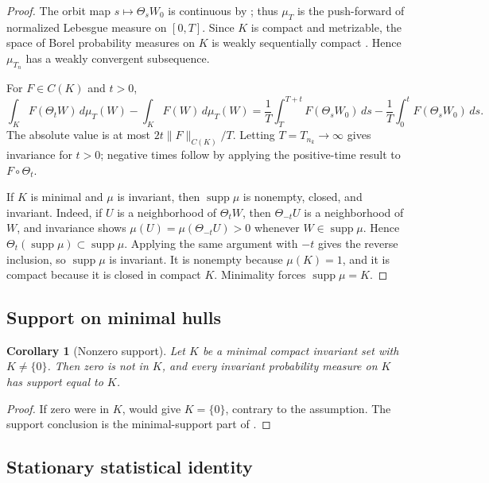 \documentclass[11pt]{amsart}
\theoremstyle{plain}
\newtheorem{corollary}[theorem]{Corollary}
\theoremstyle{definition}
\theoremstyle{remark}
\numberwithin{equation}{section}
\newcommand{\supp}{\operatorname{supp}}
\begin{document}
\begin{proof}
The orbit map \(s\mapsto\Theta_sW_0\) is continuous by
; thus \(\mu_T\) is the push-forward of normalized
Lebesgue measure on \([0,T]\).  Since \(K\) is compact and metrizable, the
space of Borel probability measures on \(K\) is weakly sequentially compact
\cite{Billingsley1999}.  Hence \(\mu_{T_n}\) has a weakly convergent
subsequence.

For \(F\in C(K)\) and \(t>0\),
\[
   \int_K F(\Theta_tW)\,d\mu_T(W)-\int_KF(W)\,d\mu_T(W)
   =
   \frac1T\int_T^{T+t}F(\Theta_sW_0)\,ds
   -
   \frac1T\int_0^tF(\Theta_sW_0)\,ds .
\]
The absolute value is at most \(2t\|F\|_{C(K)}/T\).  Letting
\(T=T_{n_k}\to\infty\) gives invariance for \(t>0\); negative times follow by
applying the positive-time result to \(F\circ\Theta_t\).

If \(K\) is minimal and \(\mu\) is invariant, then \(\supp\mu\) is nonempty,
closed, and invariant.  Indeed, if \(U\) is a neighborhood of
\(\Theta_tW\), then \(\Theta_{-t}U\) is a neighborhood of \(W\), and invariance
shows \(\mu(U)=\mu(\Theta_{-t}U)>0\) whenever \(W\in\supp\mu\).  Hence
\(\Theta_t(\supp\mu)\subset\supp\mu\).  Applying the same argument with
\(-t\) gives the reverse inclusion, so \(\supp\mu\) is invariant.  It is
nonempty because \(\mu(K)=1\), and it is compact because it is closed in
compact \(K\).  Minimality forces \(\supp\mu=K\).
\end{proof}

\subsection{Support on minimal hulls}

\begin{corollary}[Nonzero support]\label{cor:nonzero-support}
Let \(K\) be a minimal compact invariant set with \(K\ne\{0\}\).  Then zero is
not in \(K\), and every invariant probability measure on \(K\) has support
equal to \(K\).
\end{corollary}

\begin{proof}
If zero were in \(K\),  would give \(K=\{0\}\),
contrary to the assumption.  The support conclusion is the minimal-support part
of .
\end{proof}

\subsection{Stationary statistical identity}
\end{document}
